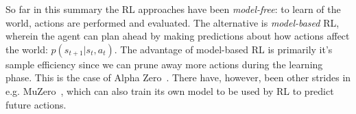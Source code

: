 \documentclass[10pt,twocolumn,letterpaper]{article}
\begin{document}

So far in this summary the \gls{RL} approaches have been \textit{model-free}: to learn of the world, actions are performed and evaluated. The alternative is \textit{model-based} \gls{RL}, wherein the agent can plan ahead by making predictions about how actions affect the world: $p(s_{t+1} \vert{} s_{t}, a_{t})$. The advantage of model-based \gls{RL} is primarily it's sample efficiency since we can prune away more actions during the learning phase. This is the case of Alpha Zero~\cite{alphaZero}. There have, however, been other strides in e.g. MuZero~\cite{muZero}, which can also train its own model to be used by \gls{RL} to predict future actions.






\end{document}
